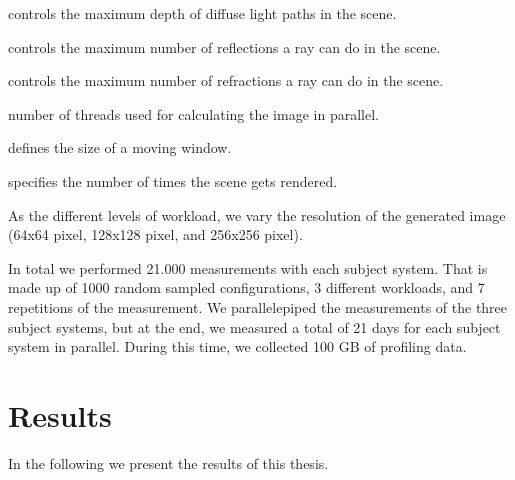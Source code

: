 
\begin{description}[style=multiline,leftmargin=11em]
	\item [DiffuseDepth] controls the maximum depth of diffuse light paths in the scene. 
	\item [ReflectionDepth] controls the maximum number of reflections a ray can do in the scene.
	\item [RefractionDepth] controls the maximum number of refractions a ray can do in the scene.
	\item [Threads] number of threads used for calculating the image in parallel.
	\item [BucketSize] defines the size of a moving window.
	\item [Samples] specifies the number of times the scene gets rendered.
\end{description}

As the different levels of workload, we vary the resolution of the generated image (64x64 pixel, 128x128 pixel, and 256x256 pixel).


In total we performed 21.000 measurements with each subject system. That is made up of 1000 random sampled configurations, 3 different workloads, and 7 repetitions of the measurement. We parallelepiped the measurements of the three subject systems, but at the end, we measured a total of 21 days for each subject system in parallel. During this time, we collected 100 GB of profiling data. 


\section{Results}
\label{results}

In the following we present the results of this thesis. %



